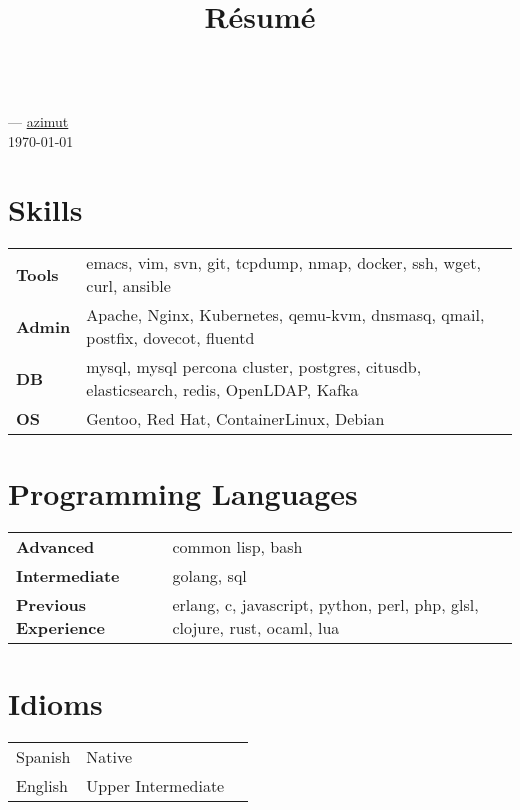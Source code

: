 \documentclass[11pt]{article}
\renewcommand{\maketitle}{
  \begin{center}{\huge\bfseries\theauthor} \\
    \vspace{.25em}
    {\faEnvelope} \href {mailto:\MAILTO} {\expandafter\randomize\expandafter{\MAILTO}}
    ---
    {\faGithub} \href {https://github.com/azimut} {azimut} \\
    \vspace{.25em}
    \today
  \end{center}
}
\begin{document}
\title{R\'esum\'e}
\author{\FULLNAME}

\maketitle

\section{Skills}


\begin{tabular}{@{}lll@{}}
  \hspace{.1em} \textbf{Tools} & emacs, vim, svn, git, tcpdump, nmap, docker, ssh, wget, curl, ansible \\
  \hspace{.1em} \textbf{Admin} & Apache, Nginx, Kubernetes, qemu-kvm, dnsmasq, qmail, postfix, dovecot, fluentd \\
  \hspace{.1em} \textbf{DB}    & mysql, mysql percona cluster, postgres, citusdb, elasticsearch, redis, OpenLDAP, Kafka \\
  \hspace{.1em} \textbf{OS}    & Gentoo, Red Hat, ContainerLinux, Debian \\
\end{tabular}


\section{Programming Languages}


\begin{tabular}{@{}lll@{}}
  \hspace{.1em} \textbf{Advanced} & common lisp, bash \\
  \hspace{.1em} \textbf{Intermediate} & golang, sql \\
  \hspace{.1em} \textbf{Previous Experience} & erlang, c, javascript, python, perl, php, glsl, clojure, rust, ocaml, lua \\
\end{tabular}


\section{Idioms}


\begin{tabular}{@{}lll@{}}
  \hspace{.1em} Spanish & Native \\
  \hspace{.1em} English & Upper Intermediate
  \\
\end{tabular}
\end{document}
